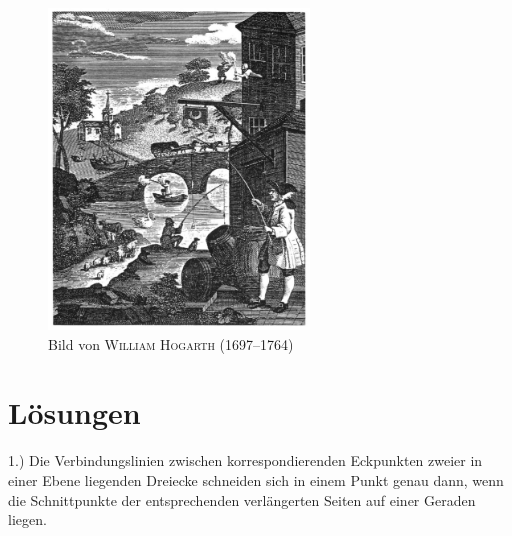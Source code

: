 \documentclass[%
11pt,%
twoside,%
titlepage,%
a4page,%
german,%
headsepline%
]{scrartcl}
\begin{document}
\begin{figure}[h!]
\begin{center}
\includegraphics[width=0.618\textwidth]{pictures/hogarth}
\caption{Bild von \textsc{William Hogarth} (1697--1764)}
\end{center}
\end{figure}

\vfill

\section*{L\"osungen}

1.) Die Verbindungslinien zwischen korrespondierenden Eckpunkten zweier in einer Ebene liegenden Dreiecke schneiden sich in einem Punkt genau dann, wenn die Schnittpunkte der entsprechenden verl\"angerten Seiten auf einer Geraden liegen.

\clearpage

%
%
\end{document}

